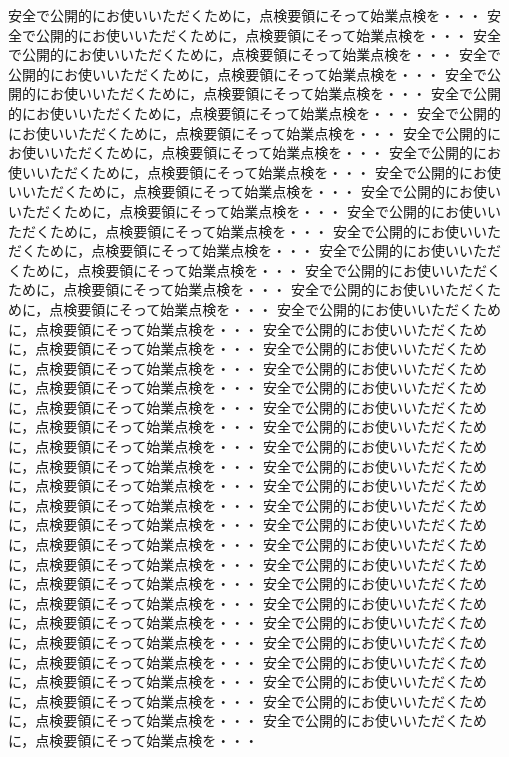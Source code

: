 \documentclass[11pt]{ltjsarticle}
\begin{document}
安全で公開的にお使いいただくために，点検要領にそって始業点検を・・・
安全で公開的にお使いいただくために，点検要領にそって始業点検を・・・
安全で公開的にお使いいただくために，点検要領にそって始業点検を・・・
安全で公開的にお使いいただくために，点検要領にそって始業点検を・・・
安全で公開的にお使いいただくために，点検要領にそって始業点検を・・・
安全で公開的にお使いいただくために，点検要領にそって始業点検を・・・
安全で公開的にお使いいただくために，点検要領にそって始業点検を・・・
安全で公開的にお使いいただくために，点検要領にそって始業点検を・・・
安全で公開的にお使いいただくために，点検要領にそって始業点検を・・・
安全で公開的にお使いいただくために，点検要領にそって始業点検を・・・
安全で公開的にお使いいただくために，点検要領にそって始業点検を・・・
安全で公開的にお使いいただくために，点検要領にそって始業点検を・・・
安全で公開的にお使いいただくために，点検要領にそって始業点検を・・・
安全で公開的にお使いいただくために，点検要領にそって始業点検を・・・
安全で公開的にお使いいただくために，点検要領にそって始業点検を・・・
安全で公開的にお使いいただくために，点検要領にそって始業点検を・・・
安全で公開的にお使いいただくために，点検要領にそって始業点検を・・・
安全で公開的にお使いいただくために，点検要領にそって始業点検を・・・
安全で公開的にお使いいただくために，点検要領にそって始業点検を・・・
安全で公開的にお使いいただくために，点検要領にそって始業点検を・・・
安全で公開的にお使いいただくために，点検要領にそって始業点検を・・・
安全で公開的にお使いいただくために，点検要領にそって始業点検を・・・
安全で公開的にお使いいただくために，点検要領にそって始業点検を・・・
安全で公開的にお使いいただくために，点検要領にそって始業点検を・・・
安全で公開的にお使いいただくために，点検要領にそって始業点検を・・・
安全で公開的にお使いいただくために，点検要領にそって始業点検を・・・
安全で公開的にお使いいただくために，点検要領にそって始業点検を・・・
安全で公開的にお使いいただくために，点検要領にそって始業点検を・・・
安全で公開的にお使いいただくために，点検要領にそって始業点検を・・・
安全で公開的にお使いいただくために，点検要領にそって始業点検を・・・
安全で公開的にお使いいただくために，点検要領にそって始業点検を・・・
安全で公開的にお使いいただくために，点検要領にそって始業点検を・・・
安全で公開的にお使いいただくために，点検要領にそって始業点検を・・・
安全で公開的にお使いいただくために，点検要領にそって始業点検を・・・
安全で公開的にお使いいただくために，点検要領にそって始業点検を・・・
安全で公開的にお使いいただくために，点検要領にそって始業点検を・・・
安全で公開的にお使いいただくために，点検要領にそって始業点検を・・・
安全で公開的にお使いいただくために，点検要領にそって始業点検を・・・
\end{document}
